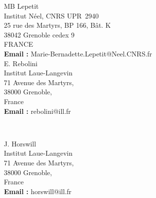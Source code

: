 \noindent 
\begin{minipage}{10cm}
  MB Lepetit \\
  Institut Néel, CNRS UPR~2940 \\                       
  25 rue des Martyrs, BP 166, Bât. K\\
  38042 Grenoble cedex 9 \\
  FRANCE \\[+1ex]                                          
  {\bf Email :} Marie-Bernadette.Lepetit@Neel.CNRS.fr
\\
  E. Rebolini \\
  Institut Laue-Langevin\\            
  71 Avenue des Martyrs,\\  
  38000 Grenoble,\\
  France\\[+1ex]                                          
  {\bf Email :} rebolini@ill.fr  \\
\end{minipage} \hfill 
\\
\begin{minipage}{8cm}
  J. Horswill \\
  Institut Laue-Langevin\\            
  71 Avenue des Martyrs,\\  
  38000 Grenoble,\\
  France\\[+1ex]                                          
  {\bf Email :} horswill@ill.fr  
\end{minipage}
      




%
%
%

